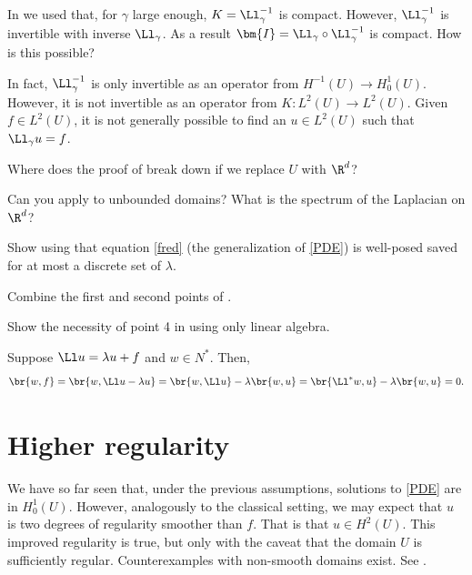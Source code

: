 \documentclass[
    a4paper,
    DIV=14,
    abstract=true,
    numbers=noenddot
]{scrartcl}
\begin{document}
\begin{exercise}
    In  we used that, for $\gamma $ large enough, $K= \Ll_{\gamma }^{-1} $ is compact. However, $\Ll_{\gamma }^{-1}$ is invertible with inverse $\Ll _\gamma $. As a result $\bm{I}=\Ll _\gamma \circ \Ll _\gamma ^{-1}$ is compact. How is this possible?
\end{exercise}
\begin{hint}
    In fact, $\Ll_\gamma^{-1} $ is only invertible as an operator from $H^{-1}(U) \to H^1_0(U)$. However, it is not invertible as an operator from $K: L^2(U) \to L^2(U)$. Given $f \in L^2(U)$, it is not generally possible to find an $u \in L^2(U)$ such that $\Ll_\gamma u =f$.
\end{hint}
\begin{exercise}
    Where does the proof of  break down if we replace $U$ with $\R^d$?
\end{exercise}
\begin{hint}
    Can you apply   to unbounded domains? What is the spectrum of the Laplacian on $\R^d$?
\end{hint}
\begin{exercise}
    Show using  that equation \eqref{fred} (the generalization of \eqref{PDE}) is well-posed saved for at most a discrete set of $\lambda$.
\end{exercise}
\begin{hint}
    Combine the first and second points of .
\end{hint}
\begin{exercise}
    Show the necessity of point 4 in  using only linear algebra.
\end{exercise}
\begin{hint}
    Suppose $\Ll u = \lambda u+f$ and $w \in N^*$. Then,
    \begin{align*}
        \br{w,f} = \br{w,\Ll u -\lambda u} = \br{w,\Ll u} -\lambda \br{w,u} =\br{\Ll^* w,u} -\lambda \br{w,u}= 0.
    \end{align*}

\end{hint}


\section{Higher regularity}\label{higher sec}
We have so far seen that, under the previous assumptions, solutions to \eqref{PDE} are in $H_0^1(U)$. However, analogously to the classical setting, we may expect that $u$ is two degrees of regularity smoother than $f$. That is that $ u \in H^2(U)$. This improved regularity is true, but only with the caveat that the domain $U$ is sufficiently regular. Counterexamples with non-smooth domains exist. See \cite{savare1998regularity}.
\end{document}
